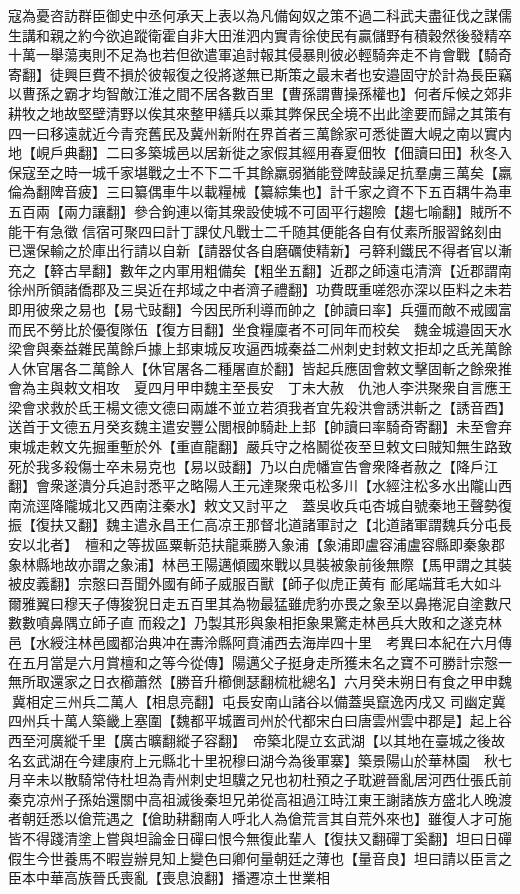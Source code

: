 寇為憂咨訪群臣御史中丞何承天上表以為凡備匈奴之策不過二科武夫盡征伐之謀儒生講和親之約今欲追蹤衛霍自非大田淮泗内實青徐使民有贏儲野有積穀然後發精卒十萬一舉蕩夷則不足為也若但欲遣軍追討報其侵暴則彼必輕騎奔走不肯會戰【騎奇寄翻】徒興巨費不損於彼報復之役將遂無已斯策之最末者也安邉固守於計為長臣竊以曹孫之霸才均智敵江淮之間不居各數百里【曹孫謂曹操孫權也】何者斥候之郊非耕牧之地故堅壁清野以俟其來整甲繕兵以乘其弊保民全境不出此塗要而歸之其策有四一曰移遠就近今青兖舊民及冀州新附在界首者三萬餘家可悉徙置大峴之南以實内地【峴戶典翻】二曰多築城邑以居新徙之家假其經用春夏佃牧【佃讀曰田】秋冬入保寇至之時一城千家堪戰之士不下二千其餘羸弱猶能登陴鼔譟足抗羣虜三萬矣【羸倫為翻陴音疲】三曰纂偶車牛以載糧械【纂綜集也】計千家之資不下五百耦牛為車五百兩【兩力讓翻】參合鉤連以衛其衆設使城不可固平行趨險【趨七喻翻】賊所不能干有急徵信宿可聚四曰計丁課仗凡戰士二千随其便能各自有仗素所服習銘刻由已還保輸之於庫出行請以自新【請器仗各自磨礪使精新】弓簳利鐵民不得者官以漸充之【簳古旱翻】數年之内軍用粗備矣【粗坐五翻】近郡之師遠屯清濟【近郡謂南徐州所領諸僑郡及三吳近在邦域之中者濟子禮翻】功費既重嗟怨亦深以臣料之未若即用彼衆之易也【易弋䜴翻】今因民所利導而帥之【帥讀曰率】兵彊而敵不戒國富而民不勞比於優復隊伍【復方目翻】坐食糧廩者不可同年而校矣　魏金城邉固天水梁會與秦益雜民萬餘戶據上邽東城反攻逼西城秦益二州刺史封敕文拒却之氐羌萬餘人休官屠各二萬餘人【休官屠各二種屠直於翻】皆起兵應固會敕文擊固斬之餘衆推會為主與敕文相攻　夏四月甲申魏主至長安　丁未大赦　仇池人李洪聚衆自言應王梁會求救於氐王楊文德文德曰兩雄不並立若須我者宜先殺洪會誘洪斬之【誘音酉】送首于文德五月癸亥魏主遣安豐公閭根帥騎赴上邽【帥讀曰率騎奇寄翻】未至會弃東城走敕文先掘重塹於外【重直龍翻】嚴兵守之格鬭從夜至旦敕文曰賊知無生路致死於我多殺傷士卒未易克也【易以豉翻】乃以白虎幡宣告會衆降者赦之【降戶江翻】會衆遂潰分兵追討悉平之略陽人王元達聚衆屯松多川【水經注松多水出隴山西南流逕降隴城北又西南注秦水】敕文又討平之　蓋吳收兵屯杏城自號秦地王聲勢復振【復扶又翻】魏主遣永昌王仁高凉王那督北道諸軍討之【北道諸軍謂魏兵分屯長安以北者】　檀和之等拔區粟斬范扶龍乘勝入象浦【象浦即盧容浦盧容縣即秦象郡象林縣地故亦謂之象浦】林邑王陽邁傾國來戰以具裝被象前後無際【馬甲謂之其裝被皮義翻】宗慤曰吾聞外國有師子威服百獸【師子似虎正黄有耏尾端茸毛大如斗爾雅翼曰穆天子傳狻猊日走五百里其為物最猛雖虎豹亦畏之象至以鼻捲泥自塗數尺數數噴鼻隅立師子直而殺之】乃製其形與象相拒象果驚走林邑兵大敗和之遂克林邑【水綬注林邑國都治典冲在夀泠縣阿賁浦西去海岸四十里　考異曰本紀在六月傳在五月當是六月賞檀和之等今從傳】陽邁父子挺身走所獲未名之寶不可勝計宗慤一無所取還家之日衣櫛蕭然【勝音升櫛側瑟翻梳枇總名】六月癸未朔日有食之甲申魏冀相定三州兵二萬人【相息亮翻】屯長安南山諸谷以備蓋吳竄逸丙戌又司幽定冀四州兵十萬人築畿上塞圍【魏都平城置司州於代都宋白曰唐雲州雲中郡是】起上谷西至河廣縱千里【廣古曠翻縱子容翻】　帝築北隄立玄武湖【以其地在臺城之後故名玄武湖在今建康府上元縣北十里祝穆曰湖今為後軍寨】築景陽山於華林園　秋七月辛未以散騎常侍杜坦為青州刺史坦驥之兄也初杜預之子耽避晉亂居河西仕張氏前秦克凉州子孫始還關中高祖滅後秦坦兄弟從高祖過江時江東王謝諸族方盛北人晚渡者朝廷悉以傖荒遇之【傖助耕翻南人呼北人為傖荒言其自荒外來也】雖復人才可施皆不得踐清塗上嘗與坦論金日磾曰恨今無復此輩人【復扶又翻磾丁奚翻】坦曰日磾假生今世養馬不暇豈辦見知上變色曰卿何量朝廷之薄也【量音良】坦曰請以臣言之臣本中華高族晉氏喪亂【喪息浪翻】播遷凉土世業相